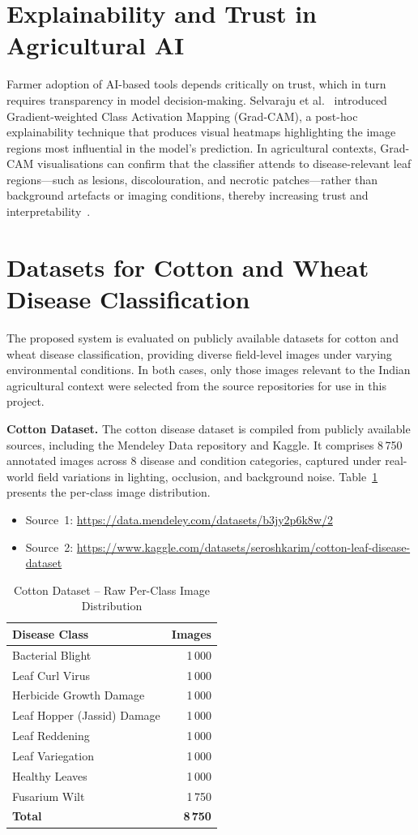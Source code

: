 \documentclass[12pt,a4paper]{report}
\begin{document}
\section{Explainability and Trust in Agricultural AI}
Farmer adoption of AI-based tools depends critically on trust, which in turn requires transparency in model decision-making. Selvaraju et al.~\cite{b3} introduced Gradient-weighted Class Activation Mapping (Grad-CAM), a post-hoc explainability technique that produces visual heatmaps highlighting the image regions most influential in the model's prediction. In agricultural contexts, Grad-CAM visualisations can confirm that the classifier attends to disease-relevant leaf regions---such as lesions, discolouration, and necrotic patches---rather than background artefacts or imaging conditions, thereby increasing trust and interpretability~\cite{b4,b12}.

\section{Datasets for Cotton and Wheat Disease Classification}
The proposed system is evaluated on publicly available datasets for cotton and wheat disease classification, providing diverse field-level images under varying environmental conditions. In both cases, only those images relevant to the Indian agricultural context were selected from the source repositories for use in this project.

\textbf{Cotton Dataset.} The cotton disease dataset is compiled from publicly available sources, including the Mendeley Data repository and Kaggle. It comprises 8\,750 annotated images across 8 disease and condition categories, captured under real-world field variations in lighting, occlusion, and background noise. Table~\ref{tab:cotton-raw} presents the per-class image distribution.
\begin{itemize}
    \item Source~1: \url{https://data.mendeley.com/datasets/b3jy2p6k8w/2}
    \item Source~2: \url{https://www.kaggle.com/datasets/seroshkarim/cotton-leaf-disease-dataset}
\end{itemize}

\begin{table}[H]
\centering
\caption{Cotton Dataset -- Raw Per-Class Image Distribution}
\label{tab:cotton-raw}
\begin{tabular}{lr}
\toprule
Disease Class & Images \\
\midrule
Bacterial Blight & 1\,000 \\
Leaf Curl Virus & 1\,000 \\
Herbicide Growth Damage & 1\,000 \\
Leaf Hopper (Jassid) Damage & 1\,000 \\
Leaf Reddening & 1\,000 \\
Leaf Variegation & 1\,000 \\
Healthy Leaves & 1\,000 \\
Fusarium Wilt & 1\,750 \\
\midrule
\textbf{Total} & \textbf{8\,750} \\
\bottomrule
\end{tabular}
\end{table}
\end{document}

